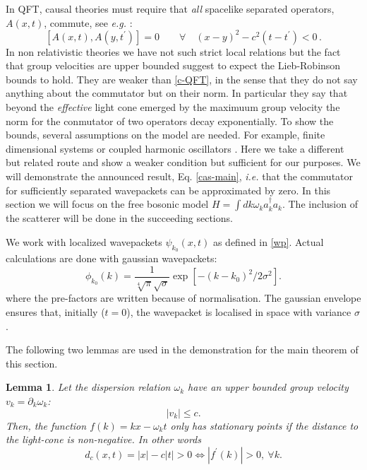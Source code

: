 \documentclass[notitlepage, prx, preprint, amsmath,superscriptaddress,amssymb]{revtex4-1}
\newtheorem{lemma}{Lemma}[section]
\begin{document}
In QFT, causal theories must require that \emph{all} spacelike separated operators, $A(x,t)$,  commute, see \emph{e.g.} \cite[Sect. 2.6.1]{tong2006}:
\begin{equation}
\label{c-QFT}
[ A (x, t), A (y,t^\prime)]= 0  \qquad \forall \quad  (x-y)^2 -c^2 (t-t^\prime) <0 \, .
\end{equation}
In non relativistic theories we have not such strict local relations but the fact that group velocities are upper bounded suggest to expect  the Lieb-Robinson bounds to hold.  They are weaker than \eqref{c-QFT}, in the sense that they do not say anything about the commutator but on their norm.  In particular they say that beyond the \emph{effective} light cone emerged by the maximuum group velocity the norm for the conmutator of two operators decay exponentially.   To show the bounds, several assumptions on the model are needed.  For example, finite dimensional systems or coupled harmonic oscillators \cite{}.  
Here we take a different but related route and show a weaker condition but sufficient for our purposes.  
We will demonstrate the announced result, Eq. \eqref{cas-main}, \emph{i.e.} that  the commutator   for sufficiently separated wavepackets can be approximated by zero.    
In this section we will focus on the free bosonic model $H = \int dk \omega_k a_k^\dagger a_k$. The inclusion of the scatterer will be done in the succeeding sections.

We  work with localized wavepackets $\psi_{k_0}(x,t)$ as defined in \eqref{wp}.  Actual calculations are done with gaussian wavepackets:
\begin{equation}
\phi_{k_0}(k) = \frac{1}{\sqrt[4]{\pi}\sqrt{\sigma}}
\exp\left[-(k-k_0)^2/2\sigma^2\right].
\label{eq:gaussian}
\end{equation}
where the pre-factors are written because of normalisation.   The gaussian envelope ensures that, initially ($t=0$), the wavepacket is localised in space with variance $\sigma$.   


The following  two lemmas  are  used  in the demonstration for the main theorem of this section.

\begin{lemma}
\label{lemma:cones}
Let the dispersion relation $\omega_k$ have an upper bounded group velocity $v_k=\partial_k \omega_k$:
\begin{equation}
\vert  v_k \vert \leq c.
\end{equation}
Then, the function $f(k) = k x - \omega_k t$ only has stationary points if the distance to the light-cone is non-negative. In other words
\begin{equation}
d_c(x,t) =  | x | - c | t |  > 0 \Leftrightarrow | f^\prime (k) | > 0,\: \forall k.\label{eq:distance}
\end{equation}
\end{lemma}
\end{document}

